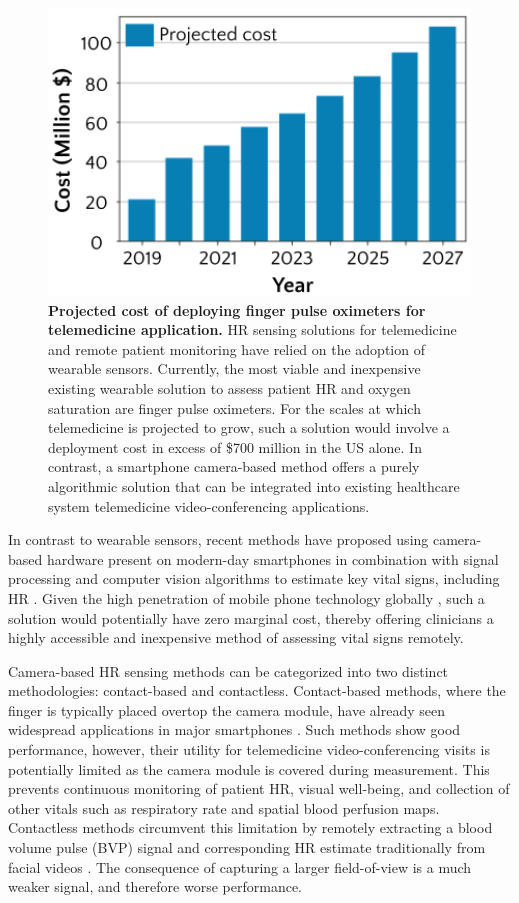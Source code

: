 \begin{figure}
    \centering
    \includegraphics[height=3in]{include/project_costs_fig.png}
    \caption{\textbf{Projected cost of deploying finger pulse oximeters for telemedicine application.} HR sensing solutions for telemedicine and remote patient monitoring have relied on the adoption of wearable sensors. Currently, the most viable and inexpensive existing wearable solution to assess patient HR and oxygen saturation are finger pulse oximeters. For the scales at which telemedicine is projected to grow, such a solution would involve a deployment cost in excess of \$700 million in the US alone. In contrast, a smartphone camera-based method offers a purely algorithmic solution that can be integrated into existing healthcare system telemedicine video-conferencing applications.}
    \label{fig:projected_costs_pulseox}
\end{figure}

In contrast to wearable sensors, recent methods have proposed using camera-based hardware present on modern-day smartphones in combination with signal processing and computer vision algorithms to estimate key vital signs, including HR \cite{}. Given the high penetration of mobile phone technology globally \cite{}, such a solution would potentially have zero marginal cost, thereby offering clinicians a highly accessible and inexpensive method of assessing vital signs remotely. 

Camera-based HR sensing methods can be categorized into two distinct methodologies: contact-based and contactless. Contact-based methods, where the finger is typically placed overtop the camera module, have already seen widespread applications in major smartphones \cite{proesmans_mobile_2019,li_current_2019}. Such methods show good performance, however, their utility for telemedicine video-conferencing visits is potentially limited as the camera module is covered during measurement. This prevents continuous monitoring of patient HR, visual well-being, and collection of other vitals such as respiratory rate and spatial blood perfusion maps. Contactless methods circumvent this limitation by remotely extracting a blood volume pulse (BVP) signal and corresponding HR estimate traditionally from facial videos \cite{}. The consequence of capturing a larger field-of-view is a much weaker signal, and therefore worse performance. 

